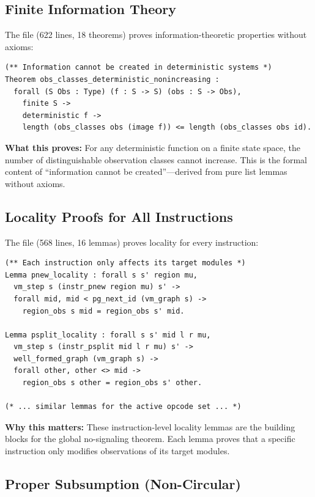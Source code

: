 \subsection{Finite Information Theory}

The file  (622 lines, 18 theorems) proves information-theoretic properties without axioms:

\begin{lstlisting}
(** Information cannot be created in deterministic systems *)
Theorem obs_classes_deterministic_nonincreasing :
  forall (S Obs : Type) (f : S -> S) (obs : S -> Obs),
    finite S ->
    deterministic f ->
    length (obs_classes obs (image f)) <= length (obs_classes obs id).
\end{lstlisting}

\textbf{What this proves:} For any deterministic function on a finite state space, the number of distinguishable observation classes cannot increase. This is the formal content of ``information cannot be created''---derived from pure list lemmas without axioms.

\subsection{Locality Proofs for All Instructions}

The file  (568 lines, 16 lemmas) proves locality for every instruction:

\begin{lstlisting}
(** Each instruction only affects its target modules *)
Lemma pnew_locality : forall s s' region mu,
  vm_step s (instr_pnew region mu) s' ->
  forall mid, mid < pg_next_id (vm_graph s) ->
    region_obs s mid = region_obs s' mid.

Lemma psplit_locality : forall s s' mid l r mu,
  vm_step s (instr_psplit mid l r mu) s' ->
  well_formed_graph (vm_graph s) ->
  forall other, other <> mid ->
    region_obs s other = region_obs s' other.

(* ... similar lemmas for the active opcode set ... *)
\end{lstlisting}

\textbf{Why this matters:} These instruction-level locality lemmas are the building blocks for the global no-signaling theorem. Each lemma proves that a specific instruction only modifies observations of its target modules.

\subsection{Proper Subsumption (Non-Circular)}

